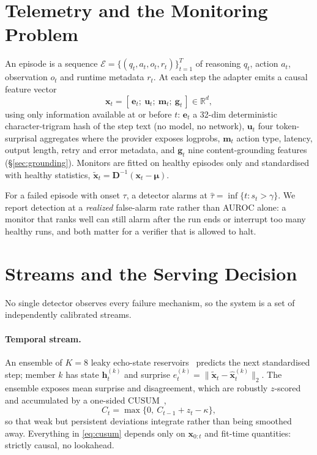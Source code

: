 \documentclass{article}
\begin{document}
\section{Telemetry and the Monitoring Problem}
\label{sec:telemetry}

An episode is a sequence $\mathcal{E}=\{(q_t,a_t,o_t,r_t)\}_{t=1}^{T}$ of
reasoning $q_t$, action $a_t$, observation $o_t$ and runtime metadata $r_t$.
At each step the adapter emits a causal feature vector
\begin{equation}
\mathbf{x}_t = [\,\mathbf{e}_t;\ \mathbf{u}_t;\ \mathbf{m}_t;\ \mathbf{g}_t\,]
\in \mathbb{R}^{d},
\label{eq:features}
\end{equation}
using only information available at or before $t$: $\mathbf{e}_t$ a 32-dim
deterministic character-trigram hash of the step text (no model, no network),
$\mathbf{u}_t$ four token-surprisal aggregates where the provider exposes
logprobs, $\mathbf{m}_t$ action type, latency, output length, retry and error
metadata, and $\mathbf{g}_t$ nine content-grounding features
(\S\ref{sec:grounding}). Monitors are fitted on healthy episodes only and
standardised with healthy statistics, $\tilde{\mathbf{x}}_t=\mathbf{D}^{-1}
(\mathbf{x}_t-\boldsymbol{\mu})$.

For a failed episode with onset $\tau$, a detector alarms at
$\hat{\tau}=\inf\{t: s_t>\gamma\}$. We report detection at a \emph{realized}
false-alarm rate rather than AUROC alone: a monitor that ranks well can still
alarm after the run ends or interrupt too many healthy runs, and both matter
for a verifier that is allowed to halt.

\section{Streams and the Serving Decision}
\label{sec:streams}

No single detector observes every failure mechanism, so the system is a set of
independently calibrated streams.

\paragraph{Temporal stream.} An ensemble of $K{=}8$ leaky echo-state
reservoirs~\cite{jaeger2001echo} predicts the next standardised step; member
$k$ has state $\mathbf{h}^{(k)}_t$ and surprise
$e^{(k)}_t=\|\tilde{\mathbf{x}}_t-\hat{\mathbf{x}}^{(k)}_t\|_2$. The ensemble
exposes mean surprise and disagreement, which are robustly $z$-scored and
accumulated by a one-sided CUSUM~\cite{page1954cusum},
\begin{equation}
C_t=\max\{0,\ C_{t-1}+z_t-\kappa\},
\label{eq:cusum}
\end{equation}
so that weak but persistent deviations integrate rather than being smoothed
away. Everything in \eqref{eq:cusum} depends only on $\mathbf{x}_{0:t}$ and
fit-time quantities: strictly causal, no lookahead.
\end{document}
